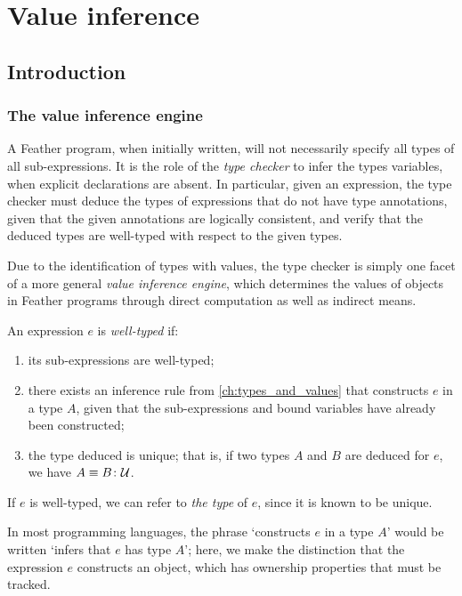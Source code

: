 \documentclass[11pt]{book}
\begin{document}
\chapter{Value inference}
\label{ch:value_inference}

\section{Introduction}

\subsection{The value inference engine}

A Feather program, when initially written, will not necessarily specify all types of all sub-expressions.
It is the role of the \textit{type checker} to infer the types variables, when explicit declarations are absent.
In particular, given an expression, the type checker must deduce the types of expressions that do not have type annotations, given that the given annotations are logically consistent, and verify that the deduced types are well-typed with respect to the given types.

Due to the identification of types with values, the type checker is simply one facet of a more general \textit{value inference engine}, which determines the values of objects in Feather programs through direct computation as well as indirect means.
\begin{defn}
  An expression \( e \) is \textit{well-typed} if:
  \begin{enumerate}
    \item its sub-expressions are well-typed;
    \item there exists an inference rule from \cref{ch:types_and_values} that constructs \( e \) in a type \( A \), given that the sub-expressions and bound variables have already been constructed;
    \item the type deduced is unique; that is, if two types \( A \) and \( B \) are deduced for \( e \), we have \( A \equiv B \colon \mathcal{U} \).
  \end{enumerate}
  If \( e \) is well-typed, we can refer to \textit{the type} of \( e \), since it is known to be unique.
\end{defn}
In most programming languages, the phrase `constructs \( e \) in a type \( A \)' would be written `infers that \( e \) has type \( A \)'; here, we make the distinction that the expression \( e \) constructs an object, which has ownership properties that must be tracked.
\end{document}
